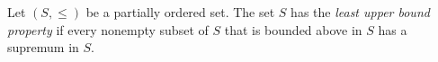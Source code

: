 \begin{definition}
\label{def:least-upper-bound-property}
Let $(S,\le)$ be a partially ordered set.  The set $S$ has the
\emph{least upper bound property} if every nonempty subset of $S$ that is
bounded above in $S$ has a supremum in $S$.
\end{definition}